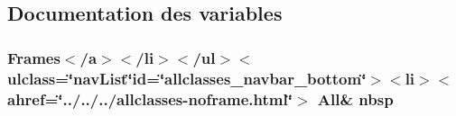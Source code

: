 \subsection{Documentation des variables}
\hypertarget{com_2cloudia_2_business_class_2package-summary_8html_aff329d23a24e17d925e4078265e1c7cf}{
\subsubsection[{nbsp}]{\setlength{\rightskip}{0pt plus 5cm}Frames$<$/{\bf a}$>$$<$/li$>$$<$/ul$>$$<$ulclass=\char`\"{}nav\-List\char`\"{}id=\char`\"{}allclasses\-\_\-navbar\-\_\-bottom\char`\"{}$>$$<$li$>$$<$ahref=\char`\"{}../../../allclasses-\/noframe.\-html\char`\"{}$>$ All\& nbsp}}\label{com_2cloudia_2_business_class_2package-summary_8html_aff329d23a24e17d925e4078265e1c7cf}
